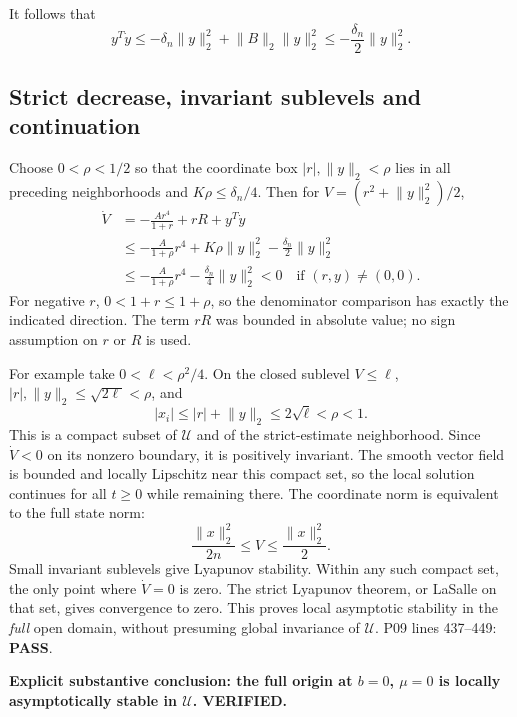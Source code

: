 \documentclass[11pt]{article}
\newcommand{\U}{\mathcal U}
\newcommand{\norm}[1]{\lVert#1\rVert}
\newcommand{\lin}[1]{P09 lines #1}
\newcommand{\pass}{\textbf{PASS}}
\begin{document}
It follows that
\[
 y^T\dot y\le-\delta_n\norm y_2^2+\norm B_2\norm y_2^2
                 \le-\frac{\delta_n}{2}\norm y_2^2.
\]

\subsection{Strict decrease, invariant sublevels and continuation}
Choose $0<\rho<1/2$ so that the coordinate box
$|r|,\norm y_2<\rho$ lies in all preceding neighborhoods and
$K\rho\le\delta_n/4$. Then for
$V=(r^2+\norm y_2^2)/2$,
\begin{align*}
 \dot V&=-\frac{Ar^4}{1+r}+rR+y^T\dot y\\
 &\le-\frac{A}{1+\rho}r^4+K\rho\norm y_2^2
                  -\frac{\delta_n}{2}\norm y_2^2\\
 &\le-\frac{A}{1+\rho}r^4-\frac{\delta_n}{4}\norm y_2^2<0
                       \quad\text{if }(r,y)\ne(0,0).
\end{align*}
For negative $r$, $0<1+r\le1+\rho$, so the denominator comparison has
exactly the indicated direction. The term $rR$ was bounded in absolute
value; no sign assumption on $r$ or $R$ is used.

For example take $0<\ell<\rho^2/4$. On the closed sublevel $V\le\ell$,
$|r|,\norm y_2\le\sqrt{2\ell}<\rho$, and
\[
 |x_i|\le|r|+\norm y_2\le2\sqrt\ell<\rho<1.
\]
This is a compact subset of $\U$ and of the strict-estimate neighborhood.
Since $\dot V<0$ on its nonzero boundary, it is positively invariant.
The smooth vector field is bounded and locally Lipschitz near this compact
set, so the local solution continues for all $t\ge0$ while remaining
there. The coordinate norm is equivalent to the full state norm:
\[
 \frac{\norm x_2^2}{2n}\le V\le\frac{\norm x_2^2}{2}.
\]
Small invariant sublevels give Lyapunov stability. Within any such compact
set, the only point where $\dot V=0$ is zero. The strict Lyapunov theorem,
or LaSalle on that set, gives convergence to zero. This proves local
asymptotic stability in the \emph{full} open domain, without presuming
global invariance of $\U$. \lin{437--449}: \pass.

\textbf{Explicit substantive conclusion: the full origin at $b=0$, $\mu=0$
is locally asymptotically stable in $\U$. VERIFIED.}
\end{document}
